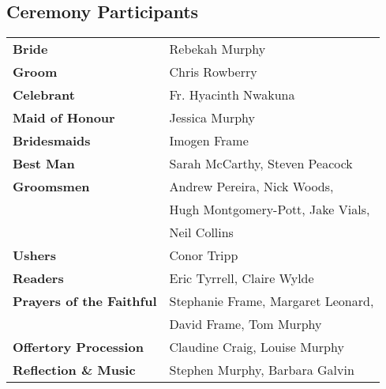 \documentclass[12pt,landscape]{article}
\begin{document}
\newpage
\begin{multicols}{2}

\vspace*{\fill}
\mbox{}
\vspace*{\fill}

\columnbreak

\section*{Ceremony Participants}

\smallskip
\begin{tabular}{@{}p{4cm}p{8cm}@{}}
\textbf{Bride} & Rebekah Murphy \\[1ex]
\textbf{Groom} & Chris Rowberry \\[1ex]
\textbf{Celebrant} & Fr. Hyacinth Nwakuna \\[1ex]
\textbf{Maid of Honour} & Jessica Murphy \\[1ex]
\textbf{Bridesmaids} & Imogen Frame \\[1ex]
\textbf{Best Man} & Sarah McCarthy, Steven Peacock \\[1ex]
\textbf{Groomsmen} & Andrew Pereira, Nick Woods,\\[0.5ex]
             & Hugh Montgomery-Pott, Jake Vials,\\[0.5ex]
             & Neil Collins \\[1ex]
\textbf{Ushers} & Conor Tripp \\[1ex]
\textbf{Readers} & Eric Tyrrell, Claire Wylde \\[1ex]
\textbf{Prayers of the Faithful} & Stephanie Frame, Margaret Leonard,\\[0.5ex]
             & David Frame, Tom Murphy \\[1ex]
\textbf{Offertory Procession} & Claudine Craig, Louise Murphy \\[1ex]
\textbf{Reflection \& Music} & Stephen Murphy, Barbara Galvin \\
\end{tabular}

\end{multicols}
\end{document}
